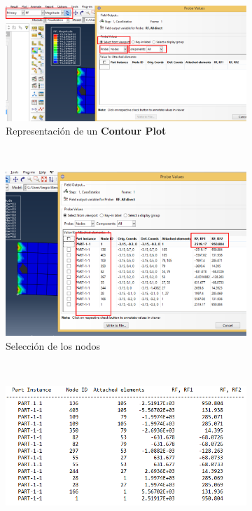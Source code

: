 \begin{enumerate}
 \begin{figure}[H]
   \centering
   \begin{subfigure}{0.30\textwidth}
     \includegraphics[width=\textwidth]{./body/images/imagen95.pdf}
     \caption{Representación de un \textbf{Contour Plot}}
     \label{figu95}
   \end{subfigure}%
   ~ %
   \begin{subfigure}{0.30\textwidth}
     \includegraphics[width=\textwidth]{./body/images/imagen96.pdf}
     \caption{Selección de los nodos}
     \label{figu96}
   \end{subfigure}%
   ~ %
   \begin{subfigure}{0.39\textwidth}
     \includegraphics[width=\textwidth]{./body/images/imagen97}

\end{subfigure}
\end{figure}
\end{enumerate}
